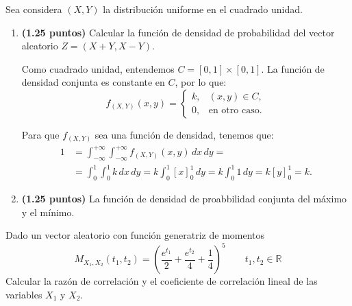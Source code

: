 \documentclass[12pt]{article}
\begin{document}
    \begin{ejercicio}
        Sea considera $(X,Y)$ la distribución uniforme en el cuadrado unidad.
        \begin{enumerate}
            \item \textbf{(1.25 puntos)} Calcular la función de densidad de probabilidad del vector aleatorio $Z = (X+Y,X-Y)$.
            
            Como cuadrado unidad, entendemos $C=[0,1]\times[0,1]$. La función de densidad conjunta es constante en $C$, por lo que:
            \begin{equation*}
                f_{(X,Y)}(x, y) = \begin{cases}
                    k, & (x,y)\in C, \\
                    0, & \text{en otro caso}.
                \end{cases}
            \end{equation*}

            Para que $f_{(X,Y)}$ sea una función de densidad, tenemos que:
            \begin{align*}
                1&=\int_{-\infty}^{+\infty} \int_{-\infty}^{+\infty} f_{(X,Y)}(x, y) \, dx \, dy
                =\\&= \int_{0}^{1} \int_{0}^{1} k \, dx \, dy
                = k\int_{0}^{1} \left[x\right]_{0}^{1} \, dy
                = k\int_{0}^{1} 1 \, dy
                = k\left[y\right]_{0}^{1}
                = k.
            \end{align*}
            \item \textbf{(1.25 puntos)} La función de densidad de proabbilidad conjunta del máximo y el mínimo.
        \end{enumerate}
    \end{ejercicio}

    \begin{ejercicio}
        Dado un vector aleatorio con función generatriz de momentos
        \begin{equation*}
            M_{X_1,X_2}(t_1,t_2) = {\left(\dfrac{e^{t_1}}{2}+\dfrac{e^{t_2}}{4}+\dfrac{1}{4}\right)}^{5} \qquad t_1,t_2 \in \mathbb{R}
        \end{equation*}
        Calcular la razón de correlación y el coeficiente de correlación lineal de las variables $X_1$ y $X_2$.
    \end{ejercicio}
\end{document}
